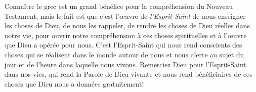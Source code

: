 Connaître le grec est un grand bénéfice pour la compréhension
 du Nouveau Testament, mais le fait est que c'est l'œuvre
 de \emph{l'Esprit-Saint} de nous enseigner les choses de Dieu,
 de nous les rappeler, de rendre les choses de Dieu réelles
 dans notre vie, pour ouvrir notre compréhension
 à ces choses spirituelles et à l'œuvre que Dieu a opérée pour nous.
 C'est l'Esprit-Saint qui nous rend conscients des choses
 qui se réalisent dans le monde autour de nous et nous alerte
 au sujet du jour et de l'heure dans laquelle nous vivons.
 Remerciez Dieu pour l'Esprit-Saint dans nos vies,
 qui rend la Parole de Dieu vivante et nous rend bénéficiaires
 de ces choses que Dieu nous a données gratuitement!

\closechapter

